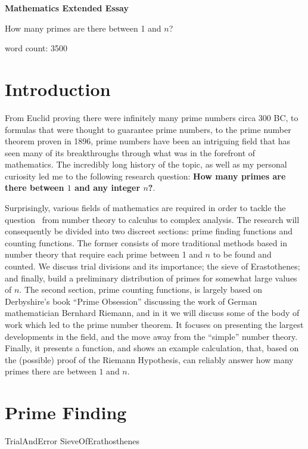 \documentclass[12pt,a4paper]{article}
\begin{document}
\begin{titlepage}
	\centering
	{\huge\bfseries Mathematics Extended Essay\par}
	\vspace{1cm}
	{\Large How many primes are there between 1 and $n$?\par}
	\vspace{1cm}
	{word count: 3500}
	\vfill

\end{titlepage}
	
\tableofcontents

\section{Introduction}
From Euclid proving there were infinitely many prime numbers circa 300 BC, to formulas that were thought to guarantee prime numbers, to the prime number theorem proven in 1896, prime numbers have been an intriguing field that has seen many of its breakthroughs through what was in the forefront of mathematics. The incredibly long history of the topic, as well as my personal curiosity led me to the following research question: \textbf{How many primes are there between $1$ and any integer $n$?}. \par

Surprisingly, various fields of mathematics are required in order to tackle the question \textendash\ from number theory to calculus to complex analysis. The research will consequently be divided into two discreet sections: prime finding functions and counting functions. The former consists of more traditional methods based in number theory that require each prime between 1 and $n$ to be found and counted. We discuss trial divisions and its importance; the sieve of Erastothenes; and finally, build a preliminary distribution of primes for somewhat large values of $n$. The second section, prime counting functions, is largely based on Derbyshire's book ``Prime Obsession'' discussing the work of German mathematician Bernhard Riemann, and in it we will discuss some of the body of work which led to the prime number theorem. It focuses on presenting the largest developments in the field, and the move away from the ``simple'' number theory. Finally, it presents a function, and shows an example calculation, that, based on the (possible) proof of the Riemann Hypothesis, can reliably answer how many primes there are between $1$ and $n$.



\section{Prime Finding}
{TrialAndError}
{SieveOfErathosthenes}
\end{document}
